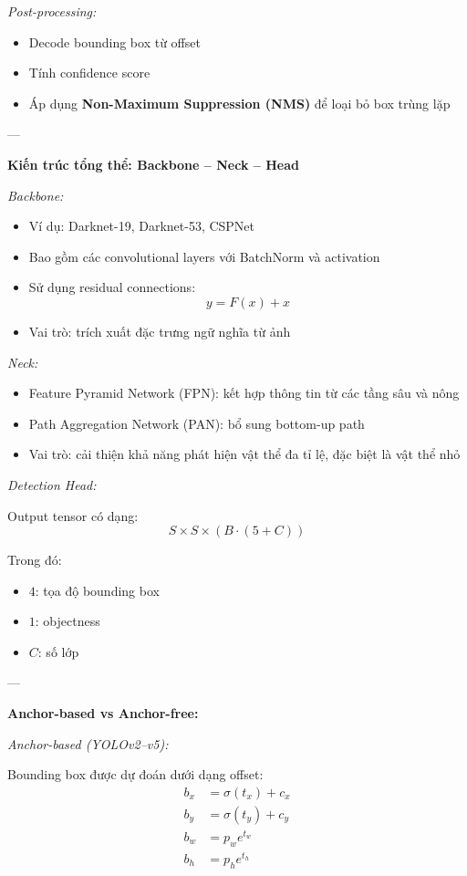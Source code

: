 \textit{Post-processing:}
\begin{itemize}
\item Decode bounding box từ offset
\item Tính confidence score
\item Áp dụng \textbf{Non-Maximum Suppression (NMS)} để loại bỏ box trùng lặp
\end{itemize}

---

\textbf{Kiến trúc tổng thể: Backbone – Neck – Head}

\textit{Backbone:}
\begin{itemize}
\item Ví dụ: Darknet-19, Darknet-53, CSPNet
\item Bao gồm các convolutional layers với BatchNorm và activation
\item Sử dụng residual connections:
\[
y = F(x) + x
\]
\item Vai trò: trích xuất đặc trưng ngữ nghĩa từ ảnh
\end{itemize}

\textit{Neck:}
\begin{itemize}
\item Feature Pyramid Network (FPN): kết hợp thông tin từ các tầng sâu và nông
\item Path Aggregation Network (PAN): bổ sung bottom-up path
\item Vai trò: cải thiện khả năng phát hiện vật thể đa tỉ lệ, đặc biệt là vật thể nhỏ
\end{itemize}

\textit{Detection Head:}

Output tensor có dạng:
\[
S \times S \times (B \cdot (5 + C))
\]

Trong đó:
\begin{itemize}
\item $4$: tọa độ bounding box
\item $1$: objectness
\item $C$: số lớp
\end{itemize}

---

\textbf{Anchor-based vs Anchor-free:}

\textit{Anchor-based (YOLOv2–v5):}

Bounding box được dự đoán dưới dạng offset:
\[
\begin{aligned}
b_x &= \sigma(t_x) + c_x \\
b_y &= \sigma(t_y) + c_y \\
b_w &= p_w e^{t_w} \\
b_h &= p_h e^{t_h}
\end{aligned}
\]

